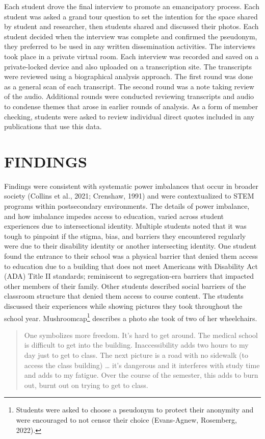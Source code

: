 \documentclass{sig-alternate} %
\begin{document}
\begin{large}
Each student drove the final interview to promote an emancipatory process. Each student was asked a grand tour question to set the intention for the space shared by student and researcher, then students shared and discussed their photos. Each student decided when the interview was complete and confirmed the pseudo\-nym, they preferred to be used in any written dissemination activities. The interviews took place in a private virtual room. Each interview was recorded and saved on a private-locked device and also uploaded on a transcription site. The transcripts were reviewed using a biographical analysis approach. The first round was done as a general scan of each transcript. The second round was a note taking review of the audio. Additional rounds were conducted reviewing transcripts and audio to condense themes that arose in earlier rounds of analysis. As a form of member checking, students were asked to review individual direct quotes included in any publications that use this data.

\section*{FINDINGS}

Findings were consistent with systematic power imbalances that occur in broader society (Collins et al., 2021; Crenshaw, 1991) and were contextualized to STEM programs within postsecondary environments. The details of power imbalance, and how imbalance impedes access to education, varied across student experiences due to intersectional identity. Multiple students noted that it was tough to pinpoint if the stigma, bias, and barriers they encountered regularly were due to their disability identity or another intersecting identity. One student found the entrance to their school was a physical barrier that denied them access to education due to a building that does not meet Americans with Disability Act (ADA) Title II standards; reminiscent to segregation-era barriers that impacted other members of their family. Other students described social barriers of the classroom structure that denied them access to course content. The students discussed their experiences while showing pictures they took throughout the school year. Mushroomcap\footnote{Students were asked to choose a pseudonym to protect their anonymity and were encouraged to not censor their choice (Evans-Agnew, Rosemberg, 2022).} describes a photo she took of two of her wheelchairs.

\begin{quote}
One symbolizes more freedom. It’s hard to get around. The medical school is difficult to get into the building. Inaccessibility adds two hours to my day just to get to class. The next picture is a road with no sidewalk (to access the class building) … it’s dangerous and it interferes with study time and adds to my fatigue. Over the course of the semester, this adds to burn out, burnt out on trying to get to class.
\end{quote}


\end{large}
\end{document}
